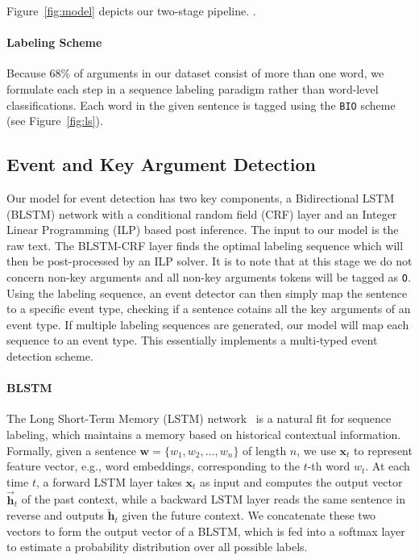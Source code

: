 Figure~\ref{fig:model} depicts our two-stage pipeline. .

\paragraph{Labeling Scheme}
Because 68\%  of  arguments in our dataset consist of more than one word, we formulate each step in a sequence labeling paradigm rather
than word-level classifications. Each word in the given sentence is tagged using the \texttt{BIO} scheme (see Figure~\ref{fig:ls}).

\subsection{Event and Key Argument Detection \label{evede}}


Our model for event detection has two key components, a Bidirectional LSTM (BLSTM) network with a conditional random field (CRF) layer and
an Integer Linear Programming (ILP) based post inference. The input to our model is the raw text. The BLSTM-CRF layer finds the optimal
labeling sequence which will then be post-processed by an ILP solver. It is to note that at this stage we do not concern non-key arguments
and all non-key arguments tokens will be tagged as \texttt{O}.  Using the labeling sequence, an event detector can then simply map the
sentence to a specific event type, checking if a sentence cotains all the key arguments of an event type. If multiple labeling sequences
are generated, our model will map each sequence to an event type. This essentially implements a multi-typed event detection scheme.

\paragraph{BLSTM}
The Long Short-Term Memory (LSTM) network~\cite{hochreiter1997long} is a natural fit for sequence labeling, which maintains a memory based
on historical contextual information. Formally, given a sentence $\bm{w} = \{w_1, w_2, \dots, w_n\}$ of length $n$, we use $\textbf{x}_t$
to represent feature vector, e.g., word embeddings, corresponding to the $t$-th word $w_t$. At each time $t$, a forward LSTM layer takes
$\textbf{x}_t$ as input and computes the output vector $\overrightarrow{\textbf{h}}_t$ of the past context, while a backward LSTM layer
reads the same sentence in reverse and outputs $\overleftarrow{\textbf{h}}_t$ given the future context. We concatenate these two vectors to
form the output vector of a BLSTM, which is fed into a softmax layer to estimate a probability distribution over all possible labels.

